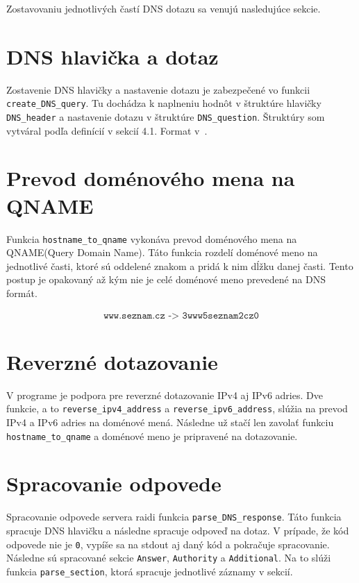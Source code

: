 Zostavovaniu jednotlivých častí DNS dotazu sa venujú nasledujúce sekcie.

\section{DNS hlavička a dotaz}
Zostavenie DNS hlavičky a nastavenie dotazu je zabezpečené vo funkcii \texttt{create\_DNS\_query}. Tu dochádza k naplneniu hodnôt v štruktúre hlavičky \texttt{DNS\_header} a nastavenie dotazu v štruktúre \texttt{DNS\_question}. Štruktúry som vytváral podľa definícií v sekcií 4.1. Format v~\cite{RFC1035}.

\section{Prevod doménového mena na QNAME}
Funkcia \texttt{hostname\_to\_qname} vykonáva prevod doménového mena na QNAME(Query Domain Name). Táto funkcia rozdelí doménové meno na jednotlivé časti, ktoré sú oddelené znakom  a pridá k nim dĺžku danej časti. Tento postup je opakovaný až kým nie je celé doménové meno prevedené na DNS formát.

\begin{gather*}
    \texttt{www.seznam.cz -> 3www5seznam2cz0}
\end{gather*}

\section{Reverzné dotazovanie}
V programe je podpora pre reverzné dotazovanie IPv4 aj IPv6 adries. Dve funkcie, a to \texttt{reverse\_ipv4\_address} a \texttt{reverse\_ipv6\_address}, slúžia na prevod IPv4 a IPv6 adries na doménové mená. Následne už stačí len zavolať funkciu \texttt{hostname\_to\_qname} a doménové meno je pripravené na dotazovanie.

\section{Spracovanie odpovede}
Spracovanie odpovede servera raidi funkcia \texttt{parse\_DNS\_response}. Táto funkcia spracuje DNS hlavičku a následne spracuje odpoveď na dotaz. V prípade, že kód odpovede nie je \texttt{0}, vypíše sa na stdout aj daný kód a pokračuje spracovanie. Následne sú spracované sekcie \texttt{Answer}, \texttt{Authority} a \texttt{Additional}. Na to slúži funkcia \texttt{parse\_section}, ktorá spracuje jednotlivé záznamy v sekcií.

